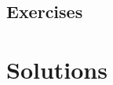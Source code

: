 \documentclass[twoside]{book}\usepackage[]{graphicx}\usepackage[]{xcolor}
\newif\ifsolutions
\newif\ifsolutionslocal
\begin{document}
\newpage
\section*{Exercises}
\shipoutProblems


\ifsolutions
\newpage
\section*{Solutions}
\shipoutSolutions
\fi
 

\backmatter




\printindex

\ifsolutions
\ifsolutionslocal\relax
\else
\newpage
\chapter*{Solutions}
\shipoutSolutions
\fi
\fi
\end{document}
